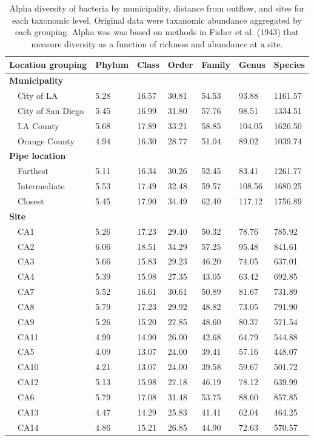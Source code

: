 \documentclass[letterpaper,12pt]{article}\usepackage[]{graphicx}\usepackage[]{color}
\begin{document}
\begin{table}[!tbp]
\caption{Alpha diversity of bacteria by municipality, distance from outflow, and sites for each taxonomic level.  Original data were taxanomic abundance aggregated by each grouping.  Alpha was was based on methods in Fisher et al. (1943) that measure diversity as a function of richness and abundance at a site.\label{tab:alpha_bac}} 
\begin{center}
\begin{tabular}{lllllll}
\hline\hline
\multicolumn{1}{l}{Location grouping}&\multicolumn{1}{c}{Phylum}&\multicolumn{1}{c}{Class}&\multicolumn{1}{c}{Order}&\multicolumn{1}{c}{Family}&\multicolumn{1}{c}{Genus}&\multicolumn{1}{c}{Species}\tabularnewline
\hline
{\bfseries Municipality}&&&&&&\tabularnewline
~~City of LA&5.28&16.57&30.81&54.53& 93.88&1161.57\tabularnewline
~~City of San Diego&5.45&16.99&31.80&57.76& 98.51&1334.51\tabularnewline
~~LA County&5.68&17.89&33.21&58.85&104.05&1626.50\tabularnewline
~~Orange County&4.94&16.30&28.77&51.04& 89.02&1039.74\tabularnewline
\hline
{\bfseries Pipe location}&&&&&&\tabularnewline
~~Farthest&5.11&16.34&30.26&52.45& 83.41&1261.77\tabularnewline
~~Intermediate&5.53&17.49&32.48&59.57&108.56&1680.25\tabularnewline
~~Closest&5.45&17.90&34.49&62.40&117.12&1756.89\tabularnewline
\hline
{\bfseries Site}&&&&&&\tabularnewline
~~CA1&5.26&17.23&29.40&50.32& 78.76& 785.92\tabularnewline
~~CA2&6.06&18.51&34.29&57.25& 95.48& 841.61\tabularnewline
~~CA3&5.66&15.83&29.23&46.20& 74.05& 637.01\tabularnewline
~~CA4&5.39&15.98&27.35&43.05& 63.42& 692.85\tabularnewline
~~CA7&5.52&16.61&30.61&50.89& 81.67& 731.89\tabularnewline
~~CA8&5.79&17.23&29.92&48.82& 73.05& 791.90\tabularnewline
~~CA9&5.26&15.20&27.85&48.60& 80.37& 571.54\tabularnewline
~~CA11&4.99&14.90&26.00&42.68& 64.79& 544.88\tabularnewline
~~CA5&4.09&13.07&24.00&39.41& 57.16& 448.07\tabularnewline
~~CA10&4.21&13.07&24.00&39.58& 59.67& 501.72\tabularnewline
~~CA12&5.13&15.98&27.18&46.19& 78.12& 639.99\tabularnewline
~~CA6&5.79&17.08&31.48&53.75& 88.60& 857.85\tabularnewline
~~CA13&4.47&14.29&25.83&41.41& 62.04& 464.25\tabularnewline
~~CA14&4.86&15.21&26.85&44.90& 72.63& 570.57\tabularnewline
\hline
\end{tabular}\end{center}
\end{table}
\end{document}
